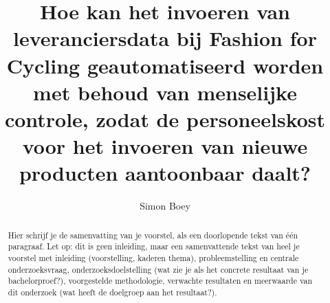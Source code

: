\documentclass{hogent-article}
\title{Hoe kan het invoeren van leveranciersdata bij Fashion for Cycling geautomatiseerd worden met behoud van menselijke controle, zodat de personeelskost voor het invoeren van nieuwe producten aantoonbaar daalt?}
\author{Simon Boey}
\begin{document}
\begin{abstract}
  Hier schrijf je de samenvatting van je voorstel, als een doorlopende tekst van één paragraaf. Let op: dit is geen inleiding, maar een samenvattende tekst van heel je voorstel met inleiding (voorstelling, kaderen thema), probleemstelling en centrale onderzoeksvraag, onderzoeksdoelstelling (wat zie je als het concrete resultaat van je bachelorproef?), voorgestelde methodologie, verwachte resultaten en meerwaarde van dit onderzoek (wat heeft de doelgroep aan het resultaat?).
\end{abstract}

\tableofcontents



\printbibliography[heading=bibintoc]
\end{document}

